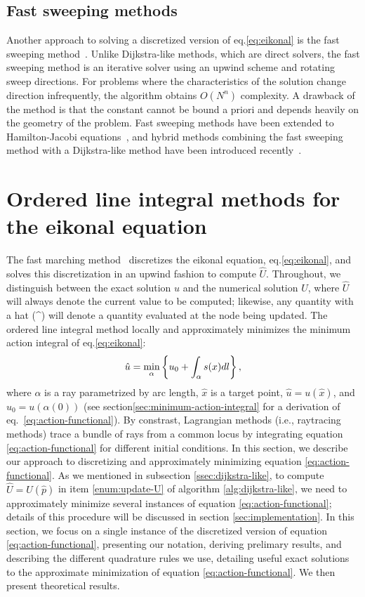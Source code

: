 \documentclass[smallcondensed]{svjour3}
\begin{document}
\subsection{Fast sweeping methods} Another approach to solving a
discretized version of eq.\@ \ref{eq:eikonal} is the fast sweeping
method~\cite{tsai2003fast,zhao2005fast}. Unlike Dijkstra-like methods,
which are direct solvers, the fast sweeping method is an iterative
solver using an upwind scheme and rotating sweep directions. For
problems where the characteristics of the solution change direction
infrequently, the algorithm obtains $O(N^n)$ complexity. A drawback of
the method is that the constant cannot be bound a priori and depends
heavily on the geometry of the problem. Fast sweeping methods have
been extended to Hamilton-Jacobi
equations~\cite{tsai2003fast,kao2008legendre}, and hybrid methods
combining the fast sweeping method with a Dijkstra-like method have
been introduced recently~\cite{chacon2012fast,chacon2015parallel}.

\section{Ordered line integral methods for the eikonal equation}

The fast marching method~\cite{sethian1996fast} discretizes the
eikonal equation, eq.\@ \ref{eq:eikonal}, and solves this
discretization in an upwind fashion to compute $\hat{U}$. Throughout,
we distinguish between the exact solution $u$ and the numerical
solution $U$, where $\hat{U}$ will always denote the current value to
be computed; likewise, any quantity with a hat (\^{}) will denote a
quantity evaluated at the node being updated. The ordered line
integral method locally and approximately minimizes the minimum action
integral of eq.\@ \ref{eq:eikonal}:
\begin{equation}
  \label{eq:action-functional}
  \hat{u} = \min_{\alpha} \left\{u_0 + \int_\alpha s(x) dl\right\},
\end{equation}
where $\alpha$ is a ray parametrized by arc length, $\hat{x}$ is a
target point, $\hat{u} = u(\hat{x})$, and $u_0 = u(\alpha(0))$ (see
section\@ \ref{sec:minimum-action-integral} for a derivation of eq.\
\ref{eq:action-functional}). By constrast, Lagrangian methods (i.e.,
raytracing methods) trace a bundle of rays from a common locus by
integrating equation \ref{eq:action-functional} for different initial
conditions. In this section, we describe our approach to discretizing
and approximately minimizing equation \ref{eq:action-functional}. As
we mentioned in subsection \ref{ssec:dijkstra-like}, to compute
$\hat{U} = U(\hat{p})$ in item \ref{enum:update-U} of algorithm
\ref{alg:dijkstra-like}, we need to approximately minimize several
instances of equation \ref{eq:action-functional}; details of this
procedure will be discussed in section \ref{sec:implementation}. In
this section, we focus on a single instance of the discretized version
of equation \ref{eq:action-functional}, presenting our notation,
deriving prelimary results, and describing the different quadrature
rules we use, detailing useful exact solutions to the approximate
minimization of equation \ref{eq:action-functional}. We then present
theoretical results.
\end{document}
